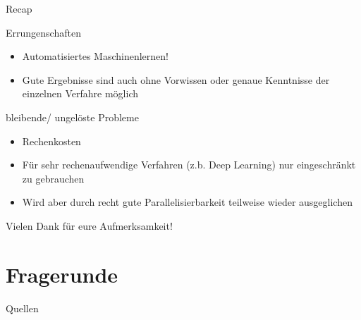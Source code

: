 \documentclass{beamer}
\begin{document}
	\begin{frame}{Recap}
		\begin{alertblock}{Errungenschaften}
			\begin{itemize}
				\item Automatisiertes Maschinenlernen!
				\item Gute Ergebnisse sind auch ohne Vorwissen oder genaue Kenntnisse der einzelnen Verfahre möglich
			\end{itemize}
		\end{alertblock}
		\pause
		\begin{alertblock}{bleibende/ ungelöste Probleme}
			\begin{itemize}
				\item Rechenkosten
				\item Für sehr rechenaufwendige Verfahren (z.b. Deep Learning) nur eingeschränkt zu gebrauchen
				\pause
				\item Wird aber durch recht gute Parallelisierbarkeit teilweise wieder ausgeglichen 
			\end{itemize}
		\end{alertblock}
	\end{frame}
	
	
	\begin{frame}{}
			Vielen Dank für eure Aufmerksamkeit!
	\end{frame}
	
	\section{Fragerunde}%
	
	\begin{frame}{Quellen}
		
		
	\end{frame}
	
\end{document}
